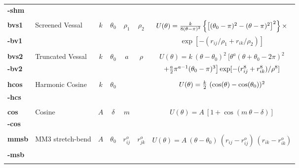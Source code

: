 \begin{enumerate}
\begin{table}[htbp]
\begin{centering}
\begin{tabular}{|l|l|c|c|c|c|c|}
{\bf -shm} &                     &     &              &            &            & \\
           &                     &     &              &            &            & \\
{\bf bvs1} & Screened Vessal \cite{vessal-94a} & $k$ & $\theta_{0}$ & $\rho_{1}$ & $\rho_{2}$ &
$U(\theta) = {k \over 8(\theta-\pi)^{2}} \left\{ \left[ (\theta_{0} - \pi)^{2} -(\theta-\pi)^{2}\right]^{2}\right\} \times$ \\
{\bf -bv1} &                     &     &              &            &            &
$\exp[-(r_{ij}/\rho_{1} + r_{ik}/\rho_{2})]$ \\
           &                     &     &              &            &            & \\
{\bf bvs2} & Truncated Vessal \cite{smith-95a} & $k$ & $\theta_{0}$ & $a$ & $\rho$ &
$U(\theta) = k~(\theta-\theta_{0})^{2}~\big[ \theta^a (\theta+\theta_{0}-2\pi)^{2}$ \\
{\bf -bv2} &                     &     &              &            &            &
$+ {a \over 2} \pi^{a-1} (\theta_{0}-\pi)^{3}\big] \exp[-(r_{ij}^{8} + r_{ik}^{8})/\rho^{8}]$ \\
           &                     &     &              &            &            & \\
{\bf hcos} & Harmonic Cosine     & $k$ & $\theta_{0}$ &            &            &
$U(\theta) = {k \over 2}~(\cos(\theta) - \cos(\theta_{0}))^{2}$ \\
{\bf -hcs} &                     &     &              &            &            & \\
           &                     &     &              &            &            & \\
{\bf cos}  & Cosine              & $A$ & $\delta$     & $m$        &            &
$U(\theta) = A~[1+\cos(m~\theta-\delta)]$ \\
{\bf -cos} &                     &     &              &            &            & \\
           &                     &     &              &            &            & \\
{\bf mmsb} & MM3 stretch-bend \cite{allinger-89a} & $A$ & $\theta_{0}$ & $r_{ij}^{o}$ & $r_{jk}^{o}$ &
$U(\theta) = A~(\theta-\theta_{0})~(r_{ij} - r_{ij}^{o})~(r_{ik} - r_{ik}^{o})$ \\
{\bf -msb} &                     &     &              &            &            & \\
           &                     &     &              &            &            & \\

\end{tabular}
\end{centering}
\end{table}
\end{enumerate}
